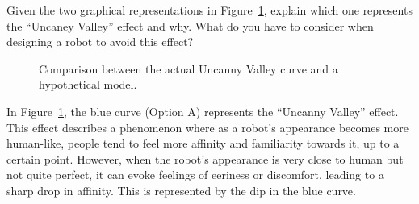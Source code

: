 \begin{ejercicio}
    Given the two graphical representations in Figure~\ref{fig:uncanny_valley_ej}, explain which one represents the ``Uncaney Valley'' effect and why. What do you have to consider when designing a robot to avoid this effect?

    \begin{figure}
        \centering
        \caption{Comparison between the actual Uncanny Valley curve and a hypothetical model.}
        \label{fig:uncanny_valley_ej}
    \end{figure}

    In Figure~\ref{fig:uncanny_valley_ej}, the blue curve (Option A) represents the ``Uncanny Valley'' effect. This effect describes a phenomenon where as a robot's appearance becomes more human-like, people tend to feel more affinity and familiarity towards it, up to a certain point. However, when the robot's appearance is very close to human but not quite perfect, it can evoke feelings of eeriness or discomfort, leading to a sharp drop in affinity. This is represented by the dip in the blue curve.


\end{ejercicio}
